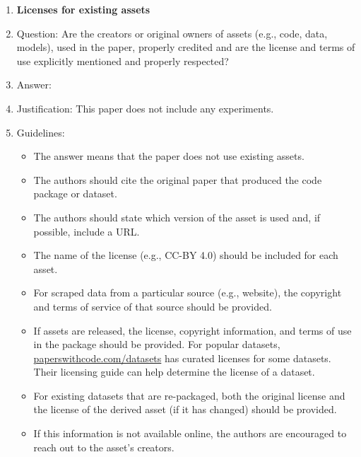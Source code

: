 \documentclass{article}
\theoremstyle{definition}
\theoremstyle{remark}
\begin{document}
\begin{enumerate}
\item {\bf Licenses for existing assets}
    \item[] Question: Are the creators or original owners of assets (e.g., code, data, models), used in the paper, properly credited and are the license and terms of use explicitly mentioned and properly respected?
    \item[] Answer: \answerNA{}%
    \item[] Justification: This paper does not include any experiments.
    \item[] Guidelines:
    \begin{itemize}
        \item The answer \answerNA{} means that the paper does not use existing assets.
        \item The authors should cite the original paper that produced the code package or dataset.
        \item The authors should state which version of the asset is used and, if possible, include a URL.
        \item The name of the license (e.g., CC-BY 4.0) should be included for each asset.
        \item For scraped data from a particular source (e.g., website), the copyright and terms of service of that source should be provided.
        \item If assets are released, the license, copyright information, and terms of use in the package should be provided. For popular datasets, \url{paperswithcode.com/datasets} has curated licenses for some datasets. Their licensing guide can help determine the license of a dataset.
        \item For existing datasets that are re-packaged, both the original license and the license of the derived asset (if it has changed) should be provided.
        \item If this information is not available online, the authors are encouraged to reach out to the asset's creators.
    \end{itemize}


\end{enumerate}
\end{document}
